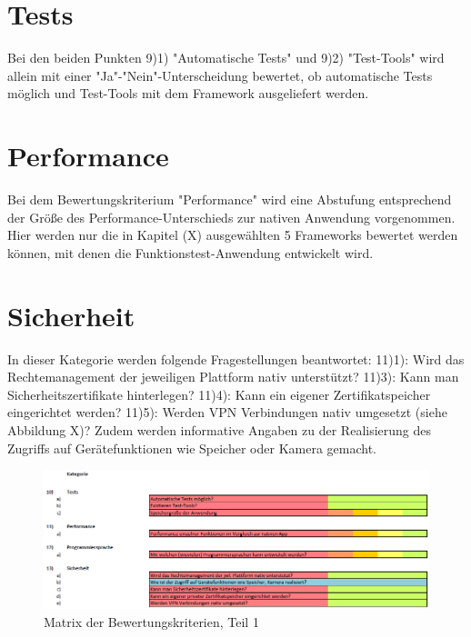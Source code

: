 \section{Tests}

Bei den beiden Punkten 9)1) "Automatische Tests" und 9)2) "Test-Tools" wird allein mit einer "Ja"-"Nein"-Unterscheidung bewertet, ob automatische Tests möglich und Test-Tools mit dem Framework ausgeliefert werden. 

\section{Performance}

Bei dem Bewertungskriterium "Performance" wird eine Abstufung entsprechend der Größe des Performance-Unterschieds zur nativen Anwendung vorgenommen. Hier werden nur die in Kapitel (X) ausgewählten 5 Frameworks bewertet werden können, mit denen die Funktionstest-Anwendung entwickelt wird. 

\section{Sicherheit}

In dieser Kategorie werden folgende Fragestellungen beantwortet: 11)1): Wird das Rechtemanagement der jeweiligen Plattform nativ unterstützt? 11)3): Kann man Sicherheitszertifikate hinterlegen? 11)4): Kann ein eigener Zertifikatspeicher eingerichtet werden? 11)5): Werden VPN Verbindungen nativ umgesetzt (siehe Abbildung X)? Zudem werden informative Angaben zu der Realisierung des Zugriffs auf Gerätefunktionen wie Speicher oder Kamera gemacht.  

\begin{figure}[h]
	\centering
	\includegraphics[width=1\textwidth]{Bilder/Bewertungsmatrix_3.PNG}
	\caption{Matrix der Bewertungskriterien, Teil 1}
	\label{fig:Bewertungskriterien_1}
\end{figure}